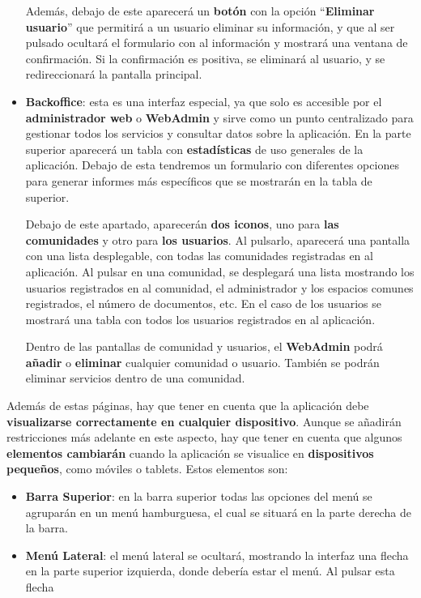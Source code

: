 \begin{appendices}
\begin{itemize}
	Además, debajo de este aparecerá un \textbf{botón} con la opción ``\textbf{Eliminar usuario}'' que permitirá a un usuario eliminar su información, y que al ser pulsado ocultará el formulario con al información y mostrará una ventana de confirmación. Si la confirmación es positiva, se eliminará al usuario, y se redireccionará la pantalla principal.
	
	\item \textbf{Backoffice}: esta es una interfaz especial, ya que solo es accesible por el \textbf{administrador web} o \textbf{WebAdmin} y sirve como un punto centralizado para gestionar todos los servicios y consultar datos sobre la aplicación.
	En la parte superior aparecerá un tabla con \textbf{estadísticas} de uso generales de la aplicación. Debajo de esta tendremos un formulario con diferentes opciones para generar informes más específicos que se mostrarán en la tabla de superior.
	
	Debajo de este apartado, aparecerán \textbf{dos iconos}, uno para \textbf{las comunidades} y otro para \textbf{los usuarios}. Al pulsarlo, aparecerá una pantalla con una lista desplegable, con todas las comunidades registradas en al aplicación. Al pulsar en una comunidad, se desplegará una lista mostrando los usuarios registrados en al comunidad, el administrador y los espacios comunes registrados, el número de documentos, etc. En el caso de los usuarios se mostrará una tabla con todos los usuarios registrados en al aplicación.
	
	Dentro de las pantallas de comunidad y usuarios, el \textbf{WebAdmin} podrá \textbf{añadir} o \textbf{eliminar} cualquier comunidad o usuario. También se podrán eliminar servicios dentro de una comunidad.
\end{itemize}

Además de estas páginas, hay que tener en cuenta que la aplicación debe \textbf{visualizarse correctamente en cualquier dispositivo}. Aunque se añadirán restricciones más adelante en este aspecto, hay que tener en cuenta que algunos \textbf{elementos cambiarán} cuando la aplicación se visualice en \textbf{dispositivos pequeños}, como móviles o tablets. Estos elementos son:

\begin{itemize}
	\item \textbf{Barra Superior}: en la barra superior todas las opciones del menú se agruparán en un \gls{menú hamburguesa}, el cual se situará en la parte derecha de la barra.
	
	\item \textbf{Menú Lateral}: el menú lateral se ocultará, mostrando la interfaz una flecha en la parte superior izquierda, donde debería estar el menú. Al pulsar esta flecha 
\end{itemize}


\end{appendices}
